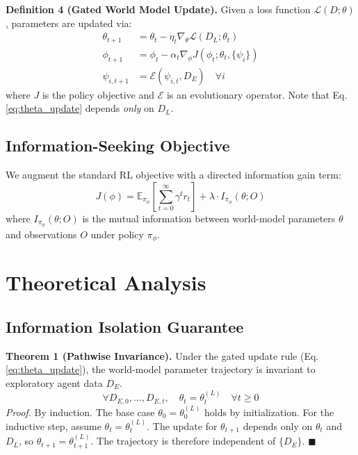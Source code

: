 \documentclass[11pt,a4paper]{article}
\begin{document}
\textbf{Definition 4 (Gated World Model Update).} Given a loss function $\mathcal{L}(D; \theta)$, parameters are updated via:
\begin{align}
    \theta_{t+1} &= \theta_t - \eta_t \nabla_{\theta} \mathcal{L}(D_L; \theta_t) \label{eq:theta_update} \\
    \phi_{t+1} &= \phi_t - \alpha_t \nabla_{\phi} J(\phi_t; \theta_t, \{\psi_i\}) \\
    \psi_{i, t+1} &= \mathcal{E}(\psi_{i,t}, D_E) \quad \forall i
\end{align}
where $J$ is the policy objective and $\mathcal{E}$ is an evolutionary operator. Note that Eq. \ref{eq:theta_update} depends \textit{only} on $D_L$.

\subsection{Information-Seeking Objective}
We augment the standard RL objective with a directed information gain term:
\begin{equation}
    J(\phi) = \mathbb{E}_{\pi_{\phi}} \left[ \sum_{t=0}^{\infty} \gamma^t r_t \right] + \lambda \cdot I_{\pi_{\phi}}(\theta; O)
\end{equation}
where $I_{\pi_{\phi}}(\theta; O)$ is the mutual information between world-model parameters $\theta$ and observations $O$ under policy $\pi_{\phi}$.

\section{Theoretical Analysis}
\subsection{Information Isolation Guarantee}
\textbf{Theorem 1 (Pathwise Invariance).} Under the gated update rule (Eq. \ref{eq:theta_update}), the world-model parameter trajectory is invariant to exploratory agent data $D_E$.
\begin{equation}
    \forall D_{E,0}, \dots, D_{E,t}, \quad \theta_t = \theta^{(L)}_t \quad \forall t \geq 0
\end{equation}
\textit{Proof.} By induction. The base case $\theta_0 = \theta_0^{(L)}$ holds by initialization. For the inductive step, assume $\theta_t = \theta_t^{(L)}$. The update for $\theta_{t+1}$ depends only on $\theta_t$ and $D_L$, so $\theta_{t+1} = \theta_{t+1}^{(L)}$. The trajectory is therefore independent of $\{D_E\}$. \hfill $\blacksquare$
\end{document}
